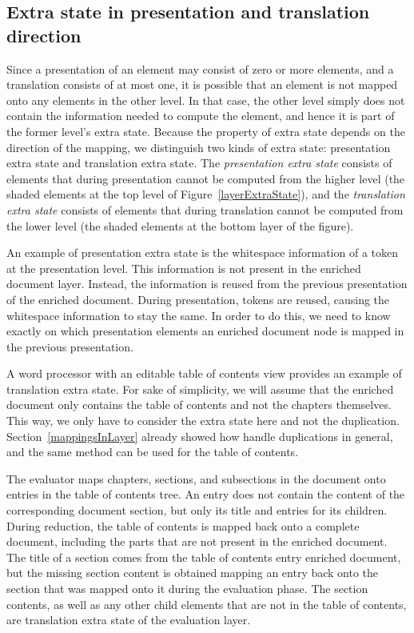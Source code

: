 

%																
\subsection{Extra state in presentation and translation direction}

Since a presentation of an element may consist of zero or more elements, and a translation consists of at most one, it is possible that an element is not mapped onto any elements in the other level. In that case, the other level simply does not contain the information needed to compute the element, and hence it is part of the former level's extra state. Because the property of extra state depends on the direction of the mapping, we distinguish two kinds of extra state: presentation extra state and translation extra state. The {\em presentation extra state} consists of elements that during presentation cannot be computed from the higher level (the shaded elements at the top level of Figure~\ref{layerExtraState}), and the {\em translation extra state} consists of elements that during translation cannot be computed from the lower level (the shaded elements at the bottom layer of the figure).

An example of presentation extra state is the whitespace information of a token at the presentation level. This information is not present in the enriched document layer. Instead, the information is reused from the previous presentation of the enriched document. During presentation, tokens are reused, causing the whitespace information to stay the same. In order to do this, we need to know exactly on which presentation elements an enriched document node is mapped in the previous presentation.

A word processor with an editable table of contents view provides an example of translation extra state.  For sake of simplicity, we will assume that the enriched document only contains the table of contents and not the chapters themselves. This way, we only have to consider the extra state here and not the duplication. Section~\ref{mappingsInLayer} already showed how handle duplications in general, and the same method can be used for the table of contents. 

The evaluator maps chapters, sections, and subsections in the document onto entries in the table of contents tree. An  entry does not contain the content of the corresponding document section, but only its title and entries for its children. During reduction, the table of contents is mapped back onto a complete document, including the parts that are not present in the enriched document. The title of a section comes from the table of contents entry enriched document, but the missing section content is obtained mapping an entry back onto the section that was mapped onto it during the evaluation phase. The section contents, as well as any other child elements that are not in the table of contents, are translation extra state of the evaluation layer.
 
